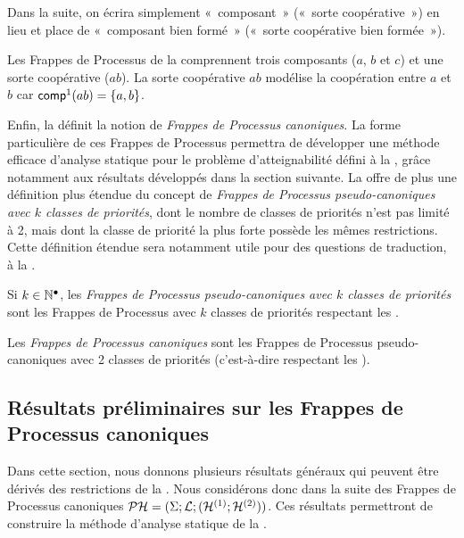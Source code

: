 Dans la suite, on écrira simplement «~composant~» (\resp «~sorte coopérative~»)
en lieu et place de «~composant bien formé~» (\resp «~sorte coopérative bien formée~»).

\begin{example}
  Les Frappes de Processus de la  comprennent trois composants ($a$, $b$ et $c$)
  et une sorte coopérative ($ab$).
  La sorte coopérative $ab$ modélise la coopération entre $a$ et $b$ car $\mathsf{comp}^1(ab) = \{ a, b \}$.
\end{example}

Enfin, la  définit la notion de \emph{Frappes de Processus canoniques}.
La forme particulière de ces Frappes de Processus permettra de développer une méthode efficace
d'analyse statique pour le problème d'atteignabilité défini à la ,
grâce notamment aux résultats développés dans la section suivante.
La  offre de plus une définition plus étendue du concept
de \emph{Frappes de Processus pseudo-canoniques avec $k$ classes de priorités},
dont le nombre de classes de priorités n'est pas limité à 2,
mais dont la classe de priorité la plus forte possède les mêmes restrictions.
Cette définition étendue sera notamment utile pour des questions de traduction,
à la .

\begin{definition}
  Si $k \in \mathbb{N}^\bullet$, les \emph{Frappes de Processus pseudo-canoniques avec $k$ classes de priorités}
  sont les Frappes de Processus avec $k$ classes de priorités
  respectant les \allcr.
\end{definition}

\begin{definition}
  Les \emph{Frappes de Processus canoniques}
  sont les Frappes de Processus pseudo-canoniques avec 2 classes de priorités
  (c'est-à-dire respectant les \allcr).
\end{definition}



\subsection{Résultats préliminaires sur les Frappes de Processus canoniques}

Dans cette section, nous donnons plusieurs résultats généraux qui peuvent être dérivés des
restrictions de la .
Nous considérons donc dans la suite des Frappes de Processus
canoniques $\mathcal{PH} = (\Sigma; \mathcal{L}; (\mathcal{H}^{(1)}; \mathcal{H}^{(2)}))$.
Ces résultats permettront de construire la méthode d'analyse statique de la .

